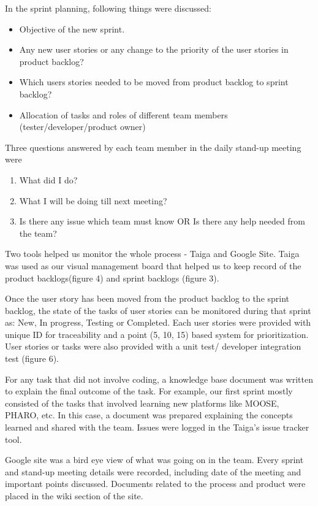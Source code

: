 \documentclass[11pt]{article}
\begin{document}
In the sprint planning, following things were discussed: 
\begin{itemize}
\item Objective of the new sprint.
\item Any new user stories or any change to the priority of the user stories 
in product backlog?
\item  Which users stories needed to be moved from product backlog to sprint backlog? 
\item Allocation of tasks and roles of different team members (tester/developer/product owner)

\end{itemize}
 
Three questions answered by each team member in the daily stand-up meeting were 
\begin{enumerate}
\item What did I do?
\item What I will be doing till next meeting? 
\item Is there any issue which team must know OR Is there any help needed from the team? 
\end{enumerate}

Two tools helped us monitor the whole process - Taiga\cite{TaigaSite} and Google Site\cite{GoogleSite}. Taiga was used as our visual management board that helped us to keep record of the product backlogs(figure 4) and sprint backlogs (figure 3). 

Once the user story has been moved from the product backlog to the sprint backlog, the state of the tasks of user stories can be monitored during that sprint as: New, In progress, Testing or Completed. Each user stories were provided with unique ID for traceability and a point (5, 10, 15) based system for prioritization. User stories or tasks were also provided with a unit test/ developer integration test (figure 6). 

For any task that did not involve coding, a knowledge base document was written to explain the final outcome of the task. For example, our first sprint mostly consisted of the tasks that involved learning new platforms like MOOSE, PHARO, etc. In this case, a document was prepared explaining the concepts learned and shared with the team. Issues were logged in the Taiga’s issue tracker tool. 

Google site\cite{GoogleSite} was a bird eye view of what was going on in the team. Every sprint and stand-up meeting details were recorded, including date of the meeting and important points discussed. Documents related to the process and product were placed in the wiki section of the site. 
\end{document}
